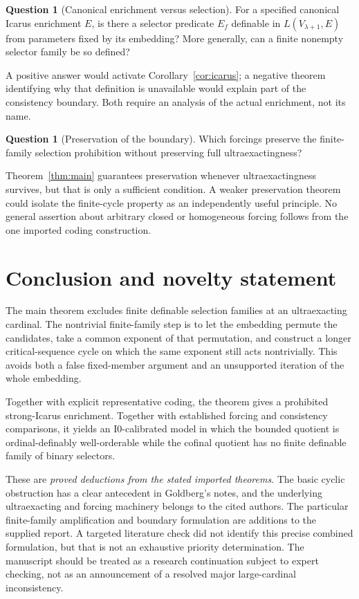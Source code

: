 \documentclass[11pt,letterpaper]{article}
\theoremstyle{definition}
\newcommand{\Izero}{\mathrm{I0}}
\newtheorem{question}[definition]{Question}
\begin{document}
\begin{question}[Canonical enrichment versus selection]
For a specified canonical Icarus enrichment $E$, is there a selector predicate $E_f$ definable in $L(V_{\lambda+1},E)$ from parameters fixed by its embedding? More generally, can a finite nonempty selector family be so defined?
\end{question}

A positive answer would activate Corollary~\ref{cor:icarus}; a negative theorem identifying why that definition is unavailable would explain part of the consistency boundary. Both require an analysis of the actual enrichment, not its name.

\begin{question}[Preservation of the boundary]
Which forcings preserve the finite-family selection prohibition without preserving full ultraexactingness?
\end{question}

Theorem~\ref{thm:main} guarantees preservation whenever ultraexactingness survives, but that is only a sufficient condition. A weaker preservation theorem could isolate the finite-cycle property as an independently useful principle. No general assertion about arbitrary closed or homogeneous forcing follows from the one imported coding construction.

\section{Conclusion and novelty statement}\label{sec:conclusion}

The main theorem excludes finite definable selection families at an ultraexacting cardinal. The nontrivial finite-family step is to let the embedding permute the candidates, take a common exponent of that permutation, and construct a longer critical-sequence cycle on which the same exponent still acts nontrivially. This avoids both a false fixed-member argument and an unsupported iteration of the whole embedding.

Together with explicit representative coding, the theorem gives a prohibited strong-Icarus enrichment. Together with established forcing and consistency comparisons, it yields an $\Izero$-calibrated model in which the bounded quotient is ordinal-definably well-orderable while the cofinal quotient has no finite definable family of binary selectors.

These are \emph{proved deductions from the stated imported theorems}. The basic cyclic obstruction has a clear antecedent in Goldberg's notes, and the underlying ultraexacting and forcing machinery belongs to the cited authors. The particular finite-family amplification and boundary formulation are additions to the supplied report. A targeted literature check did not identify this precise combined formulation, but that is not an exhaustive priority determination. The manuscript should be treated as a research continuation subject to expert checking, not as an announcement of a resolved major large-cardinal inconsistency.
\end{document}
